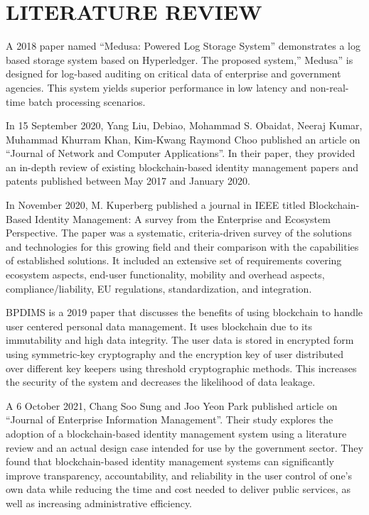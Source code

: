 \chapter{LITERATURE REVIEW}

A 2018 paper named “Medusa: Powered Log Storage System” demonstrates a log based storage system based on Hyperledger. The proposed system,” Medusa” is designed for log-based auditing on critical data of enterprise and government agencies. This system yields superior performance in low latency and non-real-time batch processing scenarios\cite{wang2018medusa}.


In 15 September 2020, Yang Liu, Debiao, Mohammad S. Obaidat, Neeraj Kumar, Muhammad Khurram Khan, Kim-Kwang Raymond Choo published an article on “Journal of Network and Computer Applications”. In their paper, they provided an in-depth review of existing blockchain-based identity management papers and patents published between May 2017 and January 2020\cite{liu2020blockchain}.
 

In November 2020, M. Kuperberg published a journal in IEEE titled Blockchain-Based Identity Management: A survey from the Enterprise and Ecosystem Perspective. The paper was a systematic, criteria-driven survey of the solutions and technologies for this growing field and their comparison with the capabilities of established solutions. It included an extensive set of requirements covering ecosystem aspects, end-user functionality, mobility and overhead aspects, compliance/liability, EU regulations, standardization, and integration\cite{kuperberg2019blockchain}.

BPDIMS is a 2019 paper that discusses the benefits of using blockchain to handle user centered personal data management. It uses blockchain due to its immutability and high data integrity. The user data is stored in encrypted form using symmetric-key cryptography and the encryption key of user distributed over different key keepers using threshold cryptographic methods. This increases the security of the system and decreases the likelihood of data leakage\cite{faber2019bpdims}.

A 6 October 2021, Chang Soo Sung and Joo Yeon Park published article on “Journal of Enterprise Information Management”. Their study explores the adoption of a blockchain-based identity management system using a literature review and an actual design case intended for use by the government sector\cite{sung2021understanding}. They found that blockchain-based identity management systems can significantly improve transparency, accountability, and reliability in the user control of one’s own data while reducing the time and cost needed to deliver public services, as well as increasing administrative efficiency.


